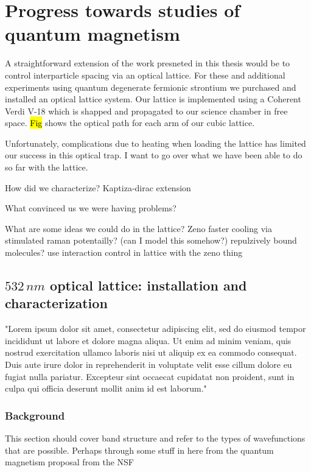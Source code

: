 \chapter{Progress towards studies of quantum magnetism}
\label{ch:chap6}

A straightforward extension of the work presneted in this thesis would be to control interparticle spacing via an optical lattice. For these and additional experiments using quantum degenerate fermionic strontium we purchased and installed an optical lattice system. Our lattice is implemented using a Coherent Verdi V-18 which is shapped and propagated to our science chamber in free space. \hl{Fig} shows the optical path for each arm of our cubic lattice. 

Unfortunately, complications due to heating when loading the lattice has limited our success in this optical trap. I want to go over what we have been able to do so far with the lattice.

How did we characterize?
	Kaptiza-dirac extension
	
What convinced us we were having problems?

What are some ideas we could do in the lattice?
	Zeno
	faster cooling via stimulated raman potentailly? (can I model this somehow?)
	repulzively bound molecules?
	use interaction control in lattice with the zeno thing
	
	

\section{$532\,nm$ optical lattice: installation and characterization}
\label{sec:lattice}

"Lorem ipsum dolor sit amet, consectetur adipiscing elit, sed do eiusmod tempor incididunt ut labore et dolore magna aliqua. Ut enim ad minim veniam, quis nostrud exercitation ullamco laboris nisi ut aliquip ex ea commodo consequat. Duis aute irure dolor in reprehenderit in voluptate velit esse cillum dolore eu fugiat nulla pariatur. Excepteur sint occaecat cupidatat non proident, sunt in culpa qui officia deserunt mollit anim id est laborum."

\subsection{Background}
\label{ssec:lattice_background}

This section should cover band structure and refer to the types of wavefunctions that are possible. Perhaps through some stuff in here from the quantum magnetism proposal from the NSF 


